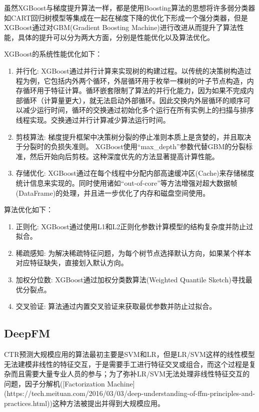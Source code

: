 虽然XGBoost与梯度提升算法一样，都是使用Boosting算法的思想将许多弱分类器如CART回归树模型等集成在一起在梯度下降的优化下形成一个强分类器，但是XGBoost通过对GBM(Gradient Boosting Machine)进行改进从而提升了算法性能，具体的提升可以分为两大方面，分别是性能优化以及算法优化。

XGBoost的系统性能优化如下：

\begin{enumerate}
  \item 并行化: XGBoost通过并行计算来实现树的构建过程。以传统的决策树构造过程为例，它包括内外两个循环，外层循环用于枚举一棵树的叶子节点构造，内存循环用于特征计算。循环嵌套限制了算法的并行化能力，因为如果不完成内部循环（计算量更大），就无法启动外部循环。因此交换内外层循环的顺序可以减少运行时间，循环的交换通过初始化多个运行在所有实例上的扫描与排序线程实现。交换通过并行计算减少算法运行时间。
  \item 剪枝算法: 梯度提升框架中决策树分裂的停止准则本质上是贪婪的，并且取决于分裂时的负损失准则。 XGBoost使用“max\_depth”参数代替GBM的分裂标准，然后开始向后剪枝。这种深度优先的方法显著提高计算性能。
  \item 存储优化: XGBoost通过在每个线程中分配内部高速缓冲区(Cache)来存储梯度统计信息来实现的。同时使用诸如“out-of-core”等方法增强对超大数据帧(DataFrame)的处理，并且进一步优化了内存和磁盘空间使用。
\end{enumerate}

算法优化如下：

\begin{enumerate}
  \item 正则化: XGBoost通过使用L1和L2正则化参数计算模型的结构复杂度并防止过拟合。
  \item 稀疏感知: 为解决稀疏特征问题，为每个树节点选择默认方向，如果某个样本对应特征缺失，直接划入默认方向。\cite{XGBoost原理解析}
  \item 加权分位数: XGBoost通过加权分类数算法(Weighted Quantile Sketch)寻找最优分裂点。
  \item 交叉验证: 算法通过内置交叉验证来获取最优参数并防止过拟合。
\end{enumerate}

\subsection{DeepFM}

CTR预测大规模应用的算法最初主要是SVM和LR，但是LR/SVM这样的线性模型无法建模非线性的特征交互，于是需要手工进行特征交叉或组合，而这个过程是复杂而且需要大量专业人员的参与；为了弥补LR/SVM无法处理非线性特征交互的问题，因子分解机([Factorization Machine](https://tech.meituan.com/2016/03/03/deep-understanding-of-ffm-principles-and-practices.html))这种方法被提出并得到大规模应用。

